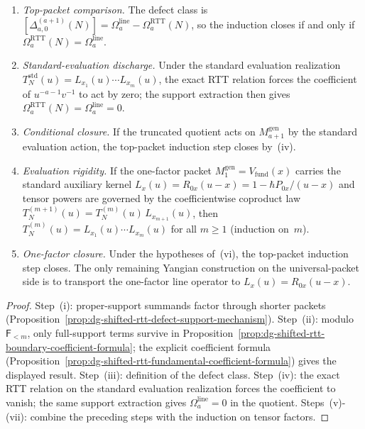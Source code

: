 \begin{proposition}
\begin{enumerate}[label=\textup{(\roman*)}]
 $T_\beta^{(1)}=-\hbar\sum_j P_{\beta,j}$ modulo $\mathsf{F}_{<m}$.
\item \emph{Top-packet comparison.}
 The defect class is
 $[\Delta^{(a+1)}_{a,0}(N)]
 =\Omega_a^{\mathrm{line}}-\Omega_a^{\mathrm{RTT}}(N)$,
 so the induction closes if and only if
 $\Omega_a^{\mathrm{RTT}}(N)=\Omega_a^{\mathrm{line}}$.
\item \emph{Standard-evaluation discharge.}
 Under the standard evaluation realization
 $T_N^{\mathrm{std}}(u)=L_{x_1}(u)\cdots L_{x_m}(u)$, the exact RTT
 relation forces the coefficient of $u^{-a-1}v^{-1}$ to act by zero;
 the support extraction then gives
 $\Omega_a^{\mathrm{RTT}}(N)=\Omega_a^{\mathrm{line}}=0$.
\item \emph{Conditional closure.}
 If the truncated quotient acts on $M_{a+1}^{\mathrm{gen}}$ by the
 standard evaluation action, the top-packet induction step closes
 by~\textup{(iv)}.
\item \emph{Evaluation rigidity.}
 If the one-factor packet $M_1^{\mathrm{gen}}=V_{\mathrm{fund}}(x)$
 carries the standard auxiliary kernel
 $L_x(u)=R_{0x}(u-x)=1-\hbar P_{0x}/(u-x)$ and tensor powers are
 governed by the coefficientwise coproduct law
 $T_N^{(m+1)}(u)=T_N^{(m)}(u)\,L_{x_{m+1}}(u)$, then
 $T_N^{(m)}(u)=L_{x_1}(u)\cdots L_{x_m}(u)$ for all $m\ge1$
 (induction on~$m$).
\item \emph{One-factor closure.}
 Under the hypotheses of~\textup{(vi)}, the top-packet induction step
 closes. The only remaining Yangian construction on the universal-packet side
 is to transport the one-factor line operator to $L_x(u)=R_{0x}(u-x)$.
\end{enumerate}
\end{proposition}

\begin{proof}
Step~\textup{(i)}: proper-support summands factor through shorter
packets (Proposition~\ref{prop:dg-shifted-rtt-defect-support-mechanism}).
Step~\textup{(ii)}: modulo $\mathsf{F}_{<m}$, only full-support terms
survive in
Proposition~\ref{prop:dg-shifted-rtt-boundary-coefficient-formula};
the explicit coefficient formula
(Proposition~\ref{prop:dg-shifted-rtt-fundamental-coefficient-formula})
gives the displayed result.
Step~\textup{(iii)}: definition of the defect class.
Step~\textup{(iv)}: the exact RTT relation on the standard evaluation
realization forces the coefficient to vanish; the same support extraction
gives $\Omega_a^{\mathrm{line}}=0$ in the quotient.
Steps~\textup{(v)}-\textup{(vii)}: combine the preceding steps with
the induction on tensor factors.
\end{proof}

